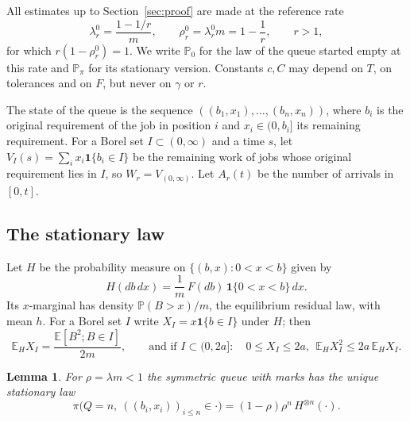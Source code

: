 \documentclass[11pt]{amsart}
\newtheorem{lemma}[theorem]{Lemma}
\theoremstyle{remark}
\numberwithin{equation}{section}
\newcommand{\E}{\mathbb E}
\newcommand{\Pp}{\mathbb P}
\newcommand{\1}{\mathbf 1}
\begin{document}
All estimates up to Section~\ref{sec:proof} are made at the reference rate
\[
\lambda_r^0=\frac{1-1/r}m,\qquad \rho_r^0=\lambda_r^0m=1-\frac1r,\qquad r>1,
\]
for which $r(1-\rho^0_r)=1$. We write $\Pp_0$ for the law of the queue started empty at this rate and $\Pp_\pi$ for its stationary version. Constants $c,C$ may depend on $T$, on tolerances and on $F$, but never on $\gamma$ or $r$.

The state of the queue is the sequence $((b_1,x_1),\dots,(b_n,x_n))$, where $b_i$ is the original requirement of the job in position $i$ and $x_i\in(0,b_i]$ its remaining requirement. For a Borel set $I\subset(0,\infty)$ and a time $s$, let $V_I(s)=\sum_ix_i\1\{b_i\in I\}$ be the remaining work of jobs whose original requirement lies in $I$, so $W_r=V_{(0,\infty)}$. Let $A_r(t)$ be the number of arrivals in $[0,t]$.

\subsection{The stationary law}
Let $H$ be the probability measure on $\{(b,x):0<x<b\}$ given by
\[
H(db\,dx)=\frac1m\,F(db)\,\1\{0<x<b\}\,dx .
\]
Its $x$-marginal has density $\Pp(B>x)/m$, the equilibrium residual law, with mean $h$. For a Borel set $I$ write $X_I=x\1\{b\in I\}$ under $H$; then
\begin{equation}\label{eq:XI}
\E_H X_I=\frac{\E[B^2;B\in I]}{2m},\qquad\text{and if }I\subset(0,2a]:\quad0\le X_I\le2a,\ \ \E_HX_I^2\le2a\,\E_HX_I .
\end{equation}

\begin{lemma}\label{lem:product}
For $\rho=\lambda m<1$ the symmetric queue with marks has the unique stationary law
\[
\pi\bigl(Q=n,\ ((b_i,x_i))_{i\le n}\in\cdot\bigr)=(1-\rho)\rho^n\,H^{\otimes n}(\cdot).
\]
\end{lemma}
\end{document}
